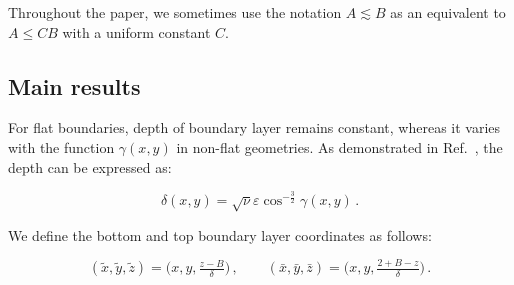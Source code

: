 \documentclass[pdflatex,sn-mathphys-num]{sn-jnl}%
\theoremstyle{thmstyleone}%
\theoremstyle{thmstyletwo}%
\theoremstyle{thmstylethree}%
\theoremstyle{thmstyletwo}
\begin{document}
Throughout the paper, we sometimes use the notation $A\lesssim B$ as an equivalent to $A \leq CB$ with a uniform constant $C$.




\subsection{Main results}\label{subsec1.2}


For flat boundaries, depth of boundary layer  remains constant, whereas it varies with the function \( \gamma(x,y) \) in non-flat geometries. As demonstrated in Ref.~\cite{Jia2024}, the depth can be expressed as:

\begin{equation}\label{1.14}
	{\delta}(x,y)=\sqrt{\nu}\varepsilon\cos^{-\frac{3}{2}}\gamma(x,y)\,.
\end{equation}

We define the bottom and top boundary layer coordinates as follows:

\begin{equation}\label{1.15}
	(\tilde x,\tilde y,\tilde z)=\Big(x,y,\tfrac{z-B}{{\delta}}\Big)\,,
	\qquad
	(\bar{x},\bar{y},\bar{z})=\Big(x,y,\tfrac{2+B-z}{{\delta}}\Big)\,.
\end{equation}
\end{document}
